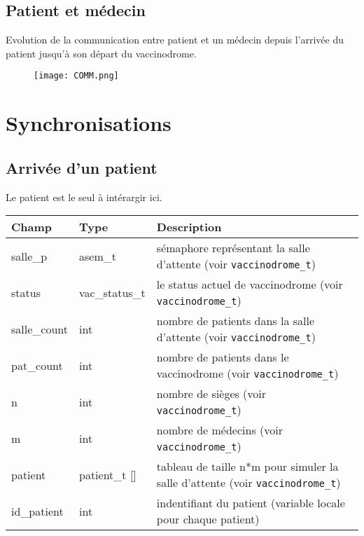 \documentclass[a4paper]{article}
\begin{document}
\newpage

\subsection{Patient et médecin}
Evolution de la communication entre patient et un médecin depuis l'arrivée du patient jusqu'à son départ du vaccinodrome.
\begin{figure}[H]
    \centering
    \texttt{[image: COMM.png]}\\[1cm]
\end{figure}

\newpage

\section{Synchronisations}

\subsection{Arrivée d'un patient}\label{arrivee-patient}

Le patient est le seul à intérargir ici.
\bigskip \newline
\begin{tabularx}{\linewidth}{|l|l|>{\strut}X|}
  \hline%
  Champ & Type & Description \\ \hline%
  salle\_p & asem\_t & sémaphore représentant la salle d'attente (voir \texttt{vaccinodrome\_t}) \\ \hline%
  status & vac\_status\_t & le status actuel de vaccinodrome (voir \texttt{vaccinodrome\_t}) \\ \hline%
  salle\_count & int & nombre de patients dans la salle d'attente (voir \texttt{vaccinodrome\_t}) \\ \hline%
  pat\_count & int & nombre de patients dans le vaccinodrome (voir \texttt{vaccinodrome\_t}) \\ \hline%
  n & int & nombre de sièges (voir \texttt{vaccinodrome\_t}) \\ \hline%
  m & int & nombre de médecins (voir \texttt{vaccinodrome\_t}) \\ \hline%
  patient & patient\_t [] & tableau de taille n*m pour simuler la salle d'attente (voir \texttt{vaccinodrome\_t})\\ \hline%
  id\_patient & int & indentifiant du patient (variable locale pour chaque patient) \\ \hline%
\end{tabularx}
\end{document}
